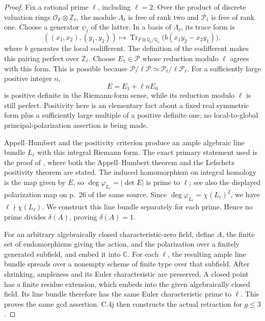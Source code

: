 \begin{proof}
Fix a rational prime \(\ell\), including \(\ell=2\).
Over the product of discrete valuation rings
\(\mathcal O_F\otimes\mathbb Z_\ell\), the module
\(\Lambda_\ell\) is free of rank two and
\(\mathcal P_\ell\) is free of rank one. Choose a generator
\(\psi_\ell\) of the latter.
In a basis of \(\Lambda_\ell\), its trace form is
\[
 ((x_1,x_2),(y_1,y_2))
       \longmapsto
 \operatorname{Tr}_{F\otimes\mathbb Q_\ell/\mathbb Q_\ell}
                    \bigl(b(x_1y_2-x_2y_1)\bigr),
\]
where \(b\) generates the local codifferent. The definition
of the codifferent makes this pairing perfect over
\(\mathbb Z_\ell\).
Choose \(E_1\in\mathcal P\) whose reduction modulo \(\ell\)
agrees with this form. This is possible because
\(\mathcal P/\ell\mathcal P
 \simeq\mathcal P_\ell/\ell\mathcal P_\ell\).
For a sufficiently large positive integer \(n\),
\[
                              E=E_1+\ell n E_0
\]
is positive definite in the Riemann-form sense, while its
reduction modulo \(\ell\) is still perfect. Positivity here
is an elementary fact about a fixed real symmetric form
plus a sufficiently large multiple of a positive definite
one; no local-to-global principal-polarization assertion
is being made.

Appell--Humbert and the positivity criterion produce an
ample algebraic line bundle \(L_\ell\) with this integral
Riemann form. The exact primary statement used is the
proof of \citet[Proposition 6.1, pp.~46--47]{frC4MilneCM2020RM},
where both the Appell--Humbert theorem and the Lefschetz
positivity theorem are stated. The induced homomorphism
on integral homology is the map given by \(E\), so
\(\deg\varphi_{L_\ell}=|\det E|\) is prime to \(\ell\);
see also the displayed polarization map on p.~26 of
the same source. Since
\(\deg\varphi_{L_\ell}=\chi(L_\ell)^2\), we have
\(\ell\nmid\chi(L_\ell)\). We construct this line bundle
separately for each prime. Hence no prime divides
\(\delta(A)\), proving \(\delta(A)=1\).

For an arbitrary algebraically closed characteristic-zero
field, define \(A\), the finite set of endomorphisms giving
the action, and the polarization over a finitely generated
subfield, and embed it into \(\mathbb C\).
For each \(\ell\), the resulting ample line bundle spreads
over a nonempty scheme of finite type over that subfield.
After shrinking, ampleness and its Euler characteristic
are preserved. A closed point has a finite residue extension,
which embeds into the given algebraically closed field.
Its line bundle therefore has the same Euler characteristic
prime to \(\ell\). This proves the same gcd assertion.
C.4j then constructs the actual retraction for \(g\le3\).


\end{proof}
